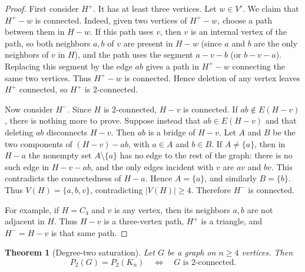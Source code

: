 \documentclass[12pt]{amsart}
\newtheorem{theorem}{Theorem}[section]
\theoremstyle{definition}
\theoremstyle{remark}
\begin{document}
\begin{proof}
First consider $H^+$.  It has at least three vertices.  Let $w\in V'$.
We claim that $H^+-w$ is connected.
Indeed, given two vertices of
$H^+-w$, choose a path between them in $H-w$.  If this path uses $v$, then
$v$ is an internal vertex of the path, so both neighbors $a,b$ of $v$ are
present in $H-w$ (since $a$ and $b$ are the only neighbors of $v$ in $H$),
and the path uses the segment $a-v-b$ (or $b-v-a$).
Replacing this segment by the edge $ab$ gives a path in
$H^+-w$ connecting the same two vertices.  Thus $H^+-w$ is connected.
Hence deletion of any vertex leaves $H^+$
connected, so $H^+$ is $2$-connected.

Now consider $H^-$.  Since $H$ is $2$-connected, $H-v$ is connected.  If
$ab\notin E(H-v)$, there is nothing more to prove.  Suppose instead that
$ab\in E(H-v)$ and that deleting $ab$ disconnects $H-v$.  Then $ab$ is a
bridge of $H-v$.  Let $A$ and $B$ be the two components of
$(H-v)-ab$, with $a\in A$ and $b\in B$.  If $A\neq\{a\}$, then in $H-a$
the nonempty set $A\setminus\{a\}$ has no edge to the rest of the graph:
there is no such edge in $H-v-ab$, and the only edges incident with $v$ are
$av$ and $bv$.  This contradicts the connectedness of $H-a$.  Hence
$A=\{a\}$, and similarly $B=\{b\}$.  Thus $V(H)=\{a,b,v\}$, contradicting
$|V(H)|\geq4$.  Therefore $H^-$ is connected.

For example, if $H=C_4$ and $v$ is any vertex, then its neighbors $a,b$ are
not adjacent in $H$.  Thus $H-v$ is a three-vertex path,
$H^+$ is a triangle, and $H^-=H-v$ is that same path.
\end{proof}

\begin{theorem}[Degree-two saturation]\label{thm:degree-two-saturation}
Let $G$ be a graph on $n\geq4$ vertices.  Then
\[
 P_2(G)=P_2(K_n)
 \quad\Longleftrightarrow\quad
 G\text{ is $2$-connected}.
\]
\end{theorem}
\end{document}
